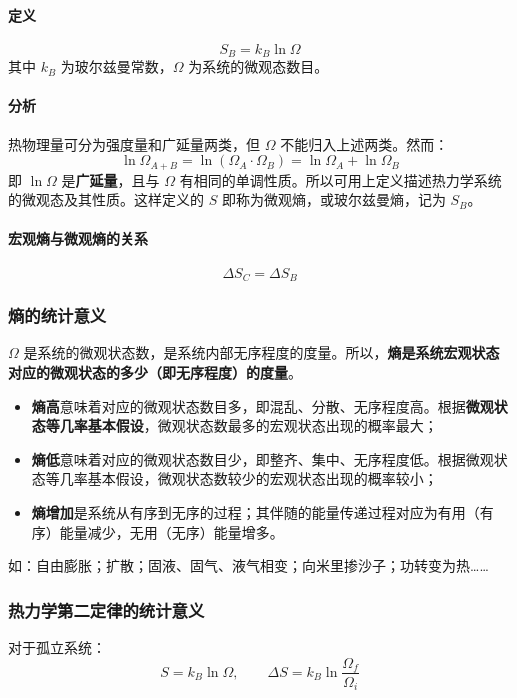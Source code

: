 \documentclass[UTF8]{ctexart}
\begin{document}
\paragraph{定义}
\[
\boxed{S_B=k_B\ln\Omega}
\]
其中 $k_B$ 为玻尔兹曼常数，$\Omega$ 为系统的微观态数目。

\paragraph{分析}
热物理量可分为强度量和广延量两类，但 $\Omega$ 不能归入上述两类。然而：
\[
\ln\Omega_{A+B}=\ln(\Omega_A\cdot\Omega_B)=\ln\Omega_A+\ln\Omega_B
\]
即 $\ln\Omega$ 是\textbf{广延量}，且与 $\Omega$ 有相同的单调性质。所以可用上定义描述热力学系统的微观态及其性质。这样定义的 $S$ 即称为微观熵，或玻尔兹曼熵，记为 $S_B$。

\paragraph{宏观熵与微观熵的关系}
\[
\boxed{\Delta S_C=\Delta S_B}
\]

\subsubsection{熵的统计意义}

$\Omega$ 是系统的微观状态数，是系统内部无序程度的度量。所以，\textbf{熵是系统宏观状态对应的微观状态的多少（即无序程度）的度量}。

\begin{itemize}[leftmargin=2em]
  \item \textbf{熵高}意味着对应的微观状态数目多，即混乱、分散、无序程度高。根据\textbf{微观状态等几率基本假设}，微观状态数最多的宏观状态出现的概率最大；
  \item \textbf{熵低}意味着对应的微观状态数目少，即整齐、集中、无序程度低。根据微观状态等几率基本假设，微观状态数较少的宏观状态出现的概率较小；
  \item \textbf{熵增加}是系统从有序到无序的过程；其伴随的能量传递过程对应为有用（有序）能量减少，无用（无序）能量增多。
\end{itemize}

如：自由膨胀；扩散；固液、固气、液气相变；向米里掺沙子；功转变为热……

\subsubsection{热力学第二定律的统计意义}

对于孤立系统：
\[
S=k_B\ln\Omega,\qquad \Delta S=k_B\ln\frac{\Omega_f}{\Omega_i}
\]
\end{document}
